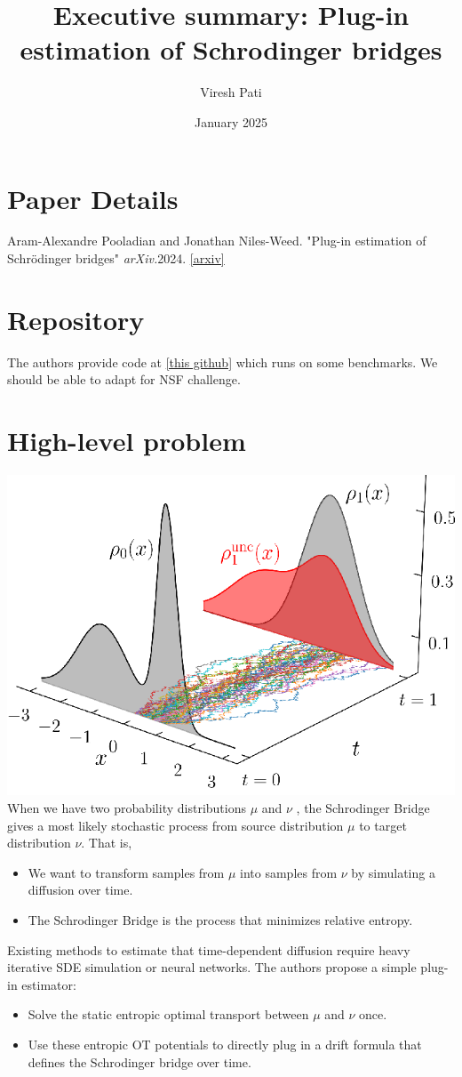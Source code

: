 \documentclass{article}
\title{Executive summary: Plug-in estimation of Schrodinger bridges
}
\author{Viresh Pati}
\date{January 2025}
\begin{document}
\maketitle

\section{Paper Details}
Aram-Alexandre Pooladian and Jonathan Niles-Weed. "Plug-in estimation of Schrödinger bridges" \textit{arXiv.}2024. \href{https://arxiv.org/abs/2408.11686}{[arxiv]}

\section{Repository}
The authors provide code at \href{https://github.com/APooladian/SinkhornBridges}{[this github]} which runs on some benchmarks. We should be able to adapt for NSF challenge.
\newpage
\section{High-level problem}
\includegraphics[width=\textwidth, height=0.4\textheight]{Smooth Schrodinger Bridges/1-Figure1-1.png}
When we have two probability distributions $\mu$ and $\nu$ , the Schrodinger Bridge gives a most likely stochastic process from source distribution $\mu$ to  target distribution $\nu$. That is,
\begin{itemize}
    \item We want to transform samples from $\mu$ into samples from $\nu$ by simulating a diffusion over time.
    \item The Schrodinger Bridge is the process that minimizes relative entropy.

\end{itemize}
Existing methods to estimate that time-dependent diffusion require heavy iterative SDE simulation or neural networks. The authors propose a simple plug-in estimator:
\begin{itemize}
    \item Solve the static entropic optimal transport between $\mu$ and $\nu$ once.
    \item Use these entropic OT potentials to directly plug in a drift formula that defines the Schrodinger bridge over time.

\end{itemize}
\end{document}

